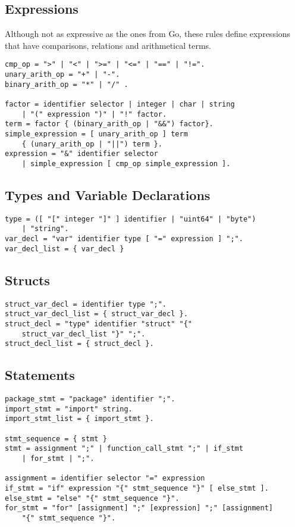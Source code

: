 \documentclass[a4paper]{scrreprt}
\begin{document}
      \subsection*{Expressions}
        Although not as expressive as the ones from Go, these rules define expressions that have comparisons, relations and arithmetical terms. 

        \begin{lstlisting}[caption=Expressions]
cmp_op = ">" | "<" | ">=" | "<=" | "==" | "!=".
unary_arith_op = "+" | "-".
binary_arith_op = "*" | "/" .

factor = identifier selector | integer | char | string 
    | "(" expression ")" | "!" factor.	
term = factor { (binary_arith_op | "&&") factor}.
simple_expression = [ unary_arith_op ] term 
    { (unary_arith_op | "||") term }.
expression = "&" identifier selector 
    | simple_expression [ cmp_op simple_expression ].
        \end{lstlisting}

      \subsection*{Types and Variable Declarations}

        \begin{lstlisting}[caption=Types]
type = ([ "[" integer "]" ] identifier | "uint64" | "byte") 
    | "string".
var_decl = "var" identifier type [ "=" expression ] ";".
var_decl_list = { var_decl }
        \end{lstlisting}

      \subsection*{Structs}

        \begin{lstlisting}[caption=Structs]
struct_var_decl = identifier type ";".
struct_var_decl_list = { struct_var_decl }.
struct_decl = "type" identifier "struct" "{" 
    struct_var_decl_list "}" ";".
struct_decl_list = { struct_decl }. 
        \end{lstlisting}

      \subsection*{Statements}

        \begin{lstlisting}[caption=Statements]
package_stmt = "package" identifier ";".
import_stmt = "import" string.
import_stmt_list = { import_stmt }.

stmt_sequence = { stmt }
stmt = assignment ";" | function_call_stmt ";" | if_stmt 
    | for_stmt | ";".

assignment = identifier selector "=" expression
if_stmt = "if" expression "{" stmt_sequence "}" [ else_stmt ].
else_stmt = "else" "{" stmt_sequence "}".
for_stmt = "for" [assignment] ";" [expression] ";" [assignment] 
    "{" stmt_sequence "}".
        \end{lstlisting}
\end{document}
